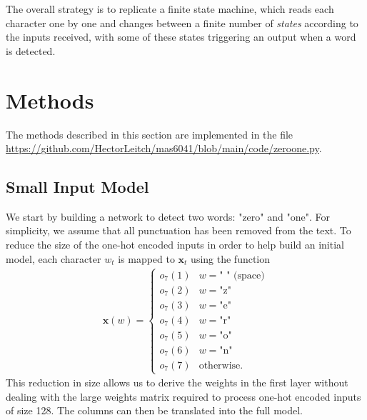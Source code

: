 \documentclass{somasmsc}
\begin{document}
The overall strategy is to replicate a finite state machine, which reads each character one by one and changes between a finite number of \textit{states} according to the inputs received, with some of these states triggering an output when a word is detected.

\section{Methods}

The methods described in this section are implemented in the file \url{https://github.com/HectorLeitch/mas6041/blob/main/code/zeroone.py}.

\subsection{Small Input Model}\label{zeroone:small}

We start by building a network to detect two words: "zero" and "one". For simplicity, we assume that all punctuation has been removed from the text. To reduce the size of the one-hot encoded inputs in order to help build an initial model, each character $w_t$ is mapped to $\pmb{x}_t$ using the function
\begin{align*}
    \mathbf{x}\left(w\right) =
    \begin{cases}
        o_7(1) & w = \text{" " (space)} \\
        o_7(2) & w = \text{"z"} \\
        o_7(3) & w = \text{"e"} \\
        o_7(4) & w = \text{"r"} \\
        o_7(5) & w = \text{"o"} \\
        o_7(6) & w = \text{"n"} \\
        o_7(7) & \text{otherwise}.
    \end{cases}
\end{align*}
This reduction in size allows us to derive the weights in the first layer without dealing with the large weights matrix required to process one-hot encoded inputs of size 128. The columns can then be translated into the full model.
\end{document}
